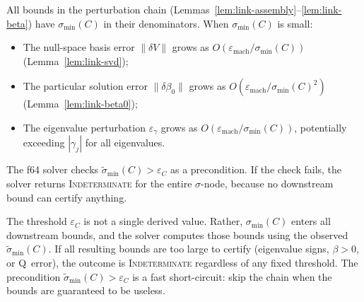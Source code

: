 %



\begin{remark}\label{rem:conditioning-precondition}
All bounds in the perturbation chain
(Lemmas~\ref{lem:link-assembly}--\ref{lem:link-beta})
have $\sigma_{\min}(C)$ in their denominators.
When $\sigma_{\min}(C)$ is small:
\begin{itemize}
  \item The null-space basis error $\|\delta V\|$ grows as
    $O(\varepsilon_{\mathrm{mach}} / \sigma_{\min}(C))$
    (Lemma~\ref{lem:link-svd});
  \item The particular solution error $\|\delta\beta_0\|$ grows as
    $O(\varepsilon_{\mathrm{mach}} / \sigma_{\min}(C)^2)$
    (Lemma~\ref{lem:link-beta0});
  \item The eigenvalue perturbation $\varepsilon_\gamma$ grows as
    $O(\varepsilon_{\mathrm{mach}} / \sigma_{\min}(C))$,
    potentially exceeding $|\gamma_j|$ for all eigenvalues.
\end{itemize}
The f64 solver checks $\tilde\sigma_{\min}(C) > \varepsilon_C$
as a precondition.
If the check fails, the solver returns \textsc{Indeterminate}
for the entire $\sigma$-node, because no downstream bound
can certify anything.

The threshold $\varepsilon_C$ is not a single derived value.
Rather, $\sigma_{\min}(C)$ enters all downstream bounds, and the
solver computes those bounds using the observed $\tilde\sigma_{\min}(C)$.
If all resulting bounds are too large to certify
(eigenvalue signs, $\beta > 0$, or Q~error), the outcome is
\textsc{Indeterminate} regardless of any fixed threshold.
The precondition $\tilde\sigma_{\min}(C) > \varepsilon_C$ is
a fast short-circuit: skip the chain when the bounds are
guaranteed to be useless.

\end{remark}


